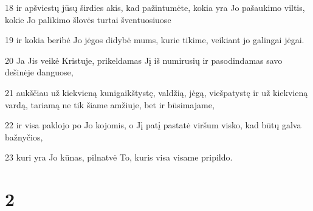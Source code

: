 \par 18 ir apšviestų jūsų širdies akis, kad pažintumėte, kokia yra Jo pašaukimo viltis, kokie Jo palikimo šlovės turtai šventuosiuose 
\par 19 ir kokia beribė Jo jėgos didybė mums, kurie tikime, veikiant jo galingai jėgai. 
\par 20 Ja Jis veikė Kristuje, prikeldamas Jį iš numirusių ir pasodindamas savo dešinėje danguose, 
\par 21 aukščiau už kiekvieną kunigaikštystę, valdžią, jėgą, viešpatystę ir už kiekvieną vardą, tariamą ne tik šiame amžiuje, bet ir būsimajame, 
\par 22 ir visa paklojo po Jo kojomis, o Jį patį pastatė viršum visko, kad būtų galva bažnyčios, 
\par 23 kuri yra Jo kūnas, pilnatvė To, kuris visa visame pripildo.


\chapter{2}


